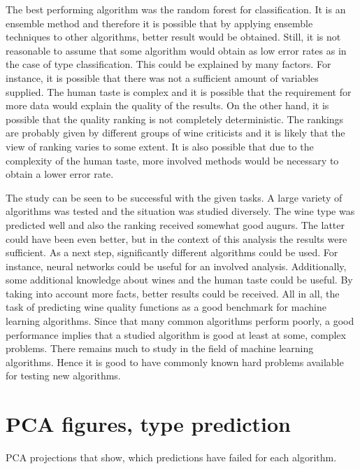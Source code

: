 \documentclass[twoside]{article}
\begin{document}
\begin{multicols}{2}
The best performing algorithm was the random forest for classification. It is an ensemble method and therefore it is possible that by applying
ensemble techniques to other algorithms, better result would be obtained. Still, it is not reasonable to assume that some algorithm would obtain
as low error rates as in the case of type classification. This could be explained by many factors. For instance, it is possible that there was not 
a sufficient amount of variables supplied. The human taste is complex and it is possible that the requirement for more data would explain the quality
of the results. On the other hand, it is possible that the quality ranking is not completely deterministic. The rankings are probably given by different
groups of wine criticists and it is likely that the view of ranking varies to some extent. It is also possible that due to the complexity of the human
taste, more involved methods would be necessary to obtain a lower error rate.

The study can be seen to be successful with the given tasks. A large variety of algorithms was tested and the situation was studied diversely.
The wine type was predicted well and also the ranking received somewhat good augurs. The latter could have been even better, but in the context of this
analysis the results were sufficient. As a next step, significantly different algorithms could be used. For instance, neural networks could be useful
for an involved analysis. Additionally, some additional knowledge about wines and the human taste could be useful. By taking into account more facts,
better results could be received. All in all, the task of predicting wine quality functions as a good benchmark for machine learning algorithms. Since
that many common algorithms perform poorly, a good performance implies that a studied algorithm is good at least at some, complex problems.
There remains much to study in the field of machine learning algorithms. Hence it is good to have commonly known hard problems available for testing
new algorithms.



{}

\appendix

\section{PCA figures, type prediction}\label{appendix:colorpcakuvet}
PCA projections that show, which predictions have failed for each algorithm.


\end{multicols}
\end{document}
